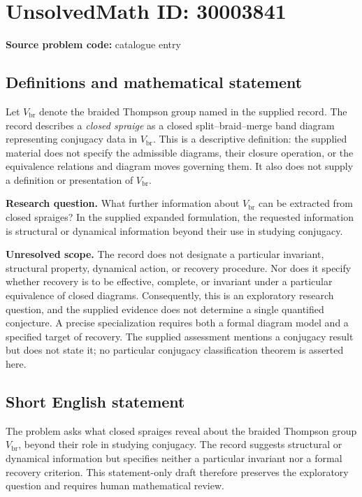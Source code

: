 \documentclass[11pt]{article}
\begin{document}
\section*{UnsolvedMath ID: 30003841}
\textbf{Source problem code:} catalogue entry
\subsection{Definitions and mathematical statement}
Let \(V_{\mathrm{br}}\) denote the braided Thompson group named in the supplied record. The record describes a \emph{closed spraige} as a closed split--braid--merge band diagram representing conjugacy data in \(V_{\mathrm{br}}\). This is a descriptive definition: the supplied material does not specify the admissible diagrams, their closure operation, or the equivalence relations and diagram moves governing them. It also does not supply a definition or presentation of \(V_{\mathrm{br}}\).

\textbf{Research question.} What further information about \(V_{\mathrm{br}}\) can be extracted from closed spraiges? In the supplied expanded formulation, the requested information is structural or dynamical information beyond their use in studying conjugacy.

\textbf{Unresolved scope.} The record does not designate a particular invariant, structural property, dynamical action, or recovery procedure. Nor does it specify whether recovery is to be effective, complete, or invariant under a particular equivalence of closed diagrams. Consequently, this is an exploratory research question, and the supplied evidence does not determine a single quantified conjecture. A precise specialization requires both a formal diagram model and a specified target of recovery. The supplied assessment mentions a conjugacy result but does not state it; no particular conjugacy classification theorem is asserted here.
\subsection{Short English statement}
The problem asks what closed spraiges reveal about the braided Thompson group \(V_{\mathrm{br}}\), beyond their role in studying conjugacy. The record suggests structural or dynamical information but specifies neither a particular invariant nor a formal recovery criterion. This statement-only draft therefore preserves the exploratory question and requires human mathematical review.
\end{document}

